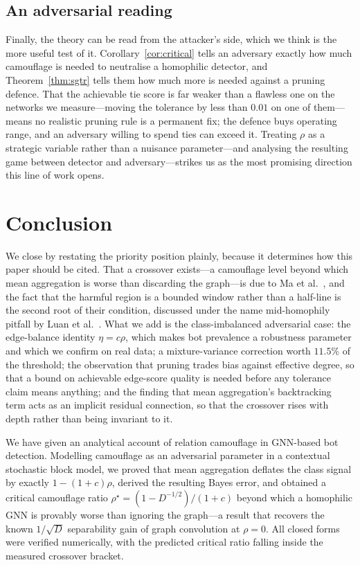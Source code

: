 \documentclass[../elsevier.tex]{subfiles}
\begin{document}
\subsection{An adversarial reading}

Finally, the theory can be read from the attacker's side, which we think is the
more useful test of it. Corollary~\ref{cor:critical} tells an adversary exactly how
much camouflage is needed to neutralise a homophilic detector, and
Theorem~\ref{thm:sgtr} tells them how much more is needed against a pruning
defence. That the achievable tie score is far weaker than a flawless one on the networks we
measure---moving the tolerance by less than $0.01$ on one of them---means no realistic
pruning rule is a permanent fix; the defence buys operating range, and an adversary
willing to spend ties can exceed it. Treating $\rho$ as a
strategic variable rather than a nuisance parameter---and analysing the resulting
game between detector and adversary---strikes us as the most promising direction
this line of work opens.

\section{Conclusion}

We close by restating the priority position plainly, because it determines how this
paper should be cited. That a crossover exists---a camouflage level beyond which mean
aggregation is worse than discarding the graph---is due to Ma
et al.~\citeyearpar{ma2022homophily}, and the fact that the harmful region is a bounded
window rather than a half-line is the second root of their condition, discussed under
the name mid-homophily pitfall by Luan et al.~\citeyearpar{luan2023when}. What we add is the
class-imbalanced adversarial case: the edge-balance identity $\eta = c\rho$, which
makes bot prevalence a robustness parameter and which we confirm on real data; a
mixture-variance correction worth $11.5\%$ of the threshold; the observation that
pruning trades bias against effective degree, so that a bound on achievable edge-score
quality is needed before any tolerance claim means anything; and the finding that mean
aggregation's backtracking term acts as an implicit residual connection, so that the
crossover rises with depth rather than being invariant to it.

\label{sec:conclusion}

We have given an analytical account of relation camouflage in GNN-based bot
detection. Modelling camouflage as an adversarial parameter in a contextual
stochastic block model, we proved that mean aggregation deflates the class signal
by exactly $1-(1+c)\rho$, derived the resulting Bayes error, and obtained a
critical camouflage ratio $\rho^\star = (1-D^{-1/2})/(1+c)$ beyond which a
homophilic GNN is provably worse than ignoring the graph---a result that recovers
the known $1/\sqrt{D}$ separability gain of graph convolution at $\rho = 0$. All closed forms were verified numerically, with
the predicted critical ratio falling inside the measured crossover bracket.
\end{document}
